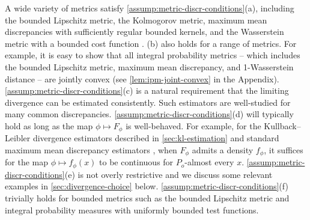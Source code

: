 A wide variety of metrics satisfy \cref{assump:metric-discr-conditions}(a), including the bounded Lipschitz metric,
the Kolmogorov metric, maximum mean discrepancies with sufficiently regular bounded kernels, and the Wasserstein metric with a bounded cost function \citep{Vaart:1996,Sriperumbudur:2010,SimonGabriel:2018,Villani:2009}.
(b) also holds for a range of metrics.
For example, it is easy to show that all integral probability metrics -- which includes the bounded Lipschitz
metric, maximum mean discrepancy, and 1-Wasserstein distance -- are jointly convex (see \cref{lem:ipm-joint-convex} in the Appendix).
\cref{assump:metric-discr-conditions}(c) is a natural requirement that the limiting divergence can be estimated consistently.
Such estimators are well-studied for many common discrepancies.
\cref{assump:metric-discr-conditions}(d) will typically hold as long as the map $\phi \mapsto F_{\phi}$ is
well-behaved.
For example, for the Kullback--Leibler divergence estimators described in \cref{sec:kl-estimation}
and standard maximum mean discrepancy estimators \citep{Gretton:2012,Krause:2023},
when $F_{\phi}$ admits a density $f_{\phi}$, it suffices for the map $\phi \mapsto f_{\phi}(x)$
to be continuous for $P_{o}$-almost every $x$.
\cref{assump:metric-discr-conditions}(e) is not overly restrictive and we discuss some relevant examples in \cref{sec:divergence-choice} below.
\cref{assump:metric-discr-conditions}(f) trivially holds for bounded metrics such as the bounded Lipschitz metric and integral probability measures with uniformly bounded test functions.

